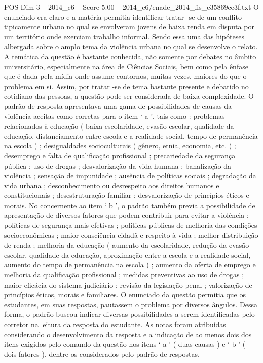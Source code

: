 \begin{textsample}{POS Dim 3 – 2014\_c6 – Score 5.00 – 2014\_c6/enade\_2014\_fis\_e35869ce3f.txt}
O enunciado era claro e a matéria permitia identificar tratar -se de um conflito tipicamente urbano no qual se envolveram jovens de baixa renda em disputa por um território onde exerciam trabalho informal.
Sendo essa uma das hipóteses albergada sobre o amplo tema da violência urbana no qual se desenvolve o relato.
A temática da questão é bastante conhecida, não somente por debates no âmbito universitário, especialmente na área de Ciências Sociais, bem como pela ênfase que é dada pela mídia onde assume contornos, muitas vezes, maiores do que o problema em si.
Assim, por tratar -se de tema bastante presente e debatido no cotidiano das pessoas, a questão pode ser considerada de baixa complexidade.
O padrão de resposta apresentava uma gama de possibilidades de causas da violência aceitas como corretas para o item ‘ a ’, tais como : problemas relacionados à educação ( baixa escolaridade, evasão escolar, qualidade da educação, distanciamento entre escola e a realidade social, tempo de permanência na escola ) ; desigualdades socioculturais ( gênero, etnia, economia, etc. ) ; desemprego e falta de qualificação profissional ; precariedade da segurança pública ; uso de drogas ; desvalorização da vida humana ; banalização da violência ; sensação de impunidade ; ausência de políticas sociais ; degradação da vida urbana ; desconhecimento ou desrespeito aos direitos humanos e constitucionais ; desestruturação familiar ; desvalorização de princípios éticos e morais.
No concernente ao item ‘ b ’, o padrão também previa a possibilidade de apresentação de diversos fatores que podem contribuir para evitar a violência : políticas de segurança mais efetivas ; políticas públicas de melhoria das condições socioeconômicas ; maior consciência cidadã e respeito à vida ; melhor distribuição de renda ; melhoria da educação ( aumento da escolaridade, redução da evasão escolar, qualidade da educação, aproximação entre a escola e a realidade social, aumento do tempo de permanência na escola ) ; aumento da oferta de emprego e melhoria da qualificação profissional ; medidas preventivas ao uso de drogas ; maior eficácia do sistema judiciário ; revisão da legislação penal ; valorização de princípios éticos, morais e familiares.
O enunciado da questão permitia que os estudantes, em suas respostas, pautassem o problema por diversos ângulos.
Dessa forma, o padrão buscou indicar diversas possibilidades a serem identificadas pelo corretor na leitura da resposta do estudante.
As notas foram atribuídas considerando o desenvolvimento da resposta e a indicação de ao menos dois dos itens exigidos pelo comando da questão nos itens ‘ a ’ ( duas causas ) e ‘ b ’ ( dois fatores ), dentre os considerados pelo padrão de respostas.

\end{textsample}
